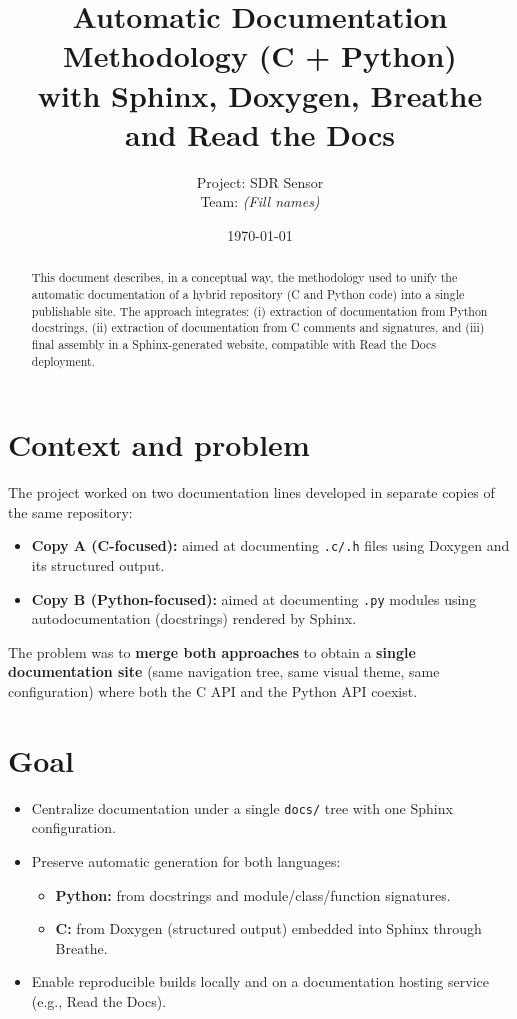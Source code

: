 \documentclass[11pt,a4paper]{article}
\title{\textbf{Automatic Documentation Methodology (C + Python)\\
with Sphinx, Doxygen, Breathe and Read the Docs}}
\author{Project: SDR Sensor \\
Team: \textit{(Fill names)}}
\date{\today}
\begin{document}
\maketitle

\begin{abstract}
This document describes, in a conceptual way, the methodology used to unify the automatic documentation of a hybrid repository (C and Python code) into a single publishable site. The approach integrates: (i) extraction of documentation from Python docstrings, (ii) extraction of documentation from C comments and signatures, and (iii) final assembly in a Sphinx-generated website, compatible with Read the Docs deployment.
\end{abstract}

\section{Context and problem}
The project worked on two documentation lines developed in separate copies of the same repository:

\begin{itemize}[leftmargin=*,itemsep=2pt]
  \item \textbf{Copy A (C-focused):} aimed at documenting \texttt{.c/.h} files using Doxygen and its structured output.
  \item \textbf{Copy B (Python-focused):} aimed at documenting \texttt{.py} modules using autodocumentation (docstrings) rendered by Sphinx.
\end{itemize}

The problem was to \textbf{merge both approaches} to obtain a \textbf{single documentation site} (same navigation tree, same visual theme, same configuration) where both the C API and the Python API coexist.

\section{Goal}
\begin{itemize}[leftmargin=*,itemsep=2pt]
  \item Centralize documentation under a single \texttt{docs/} tree with one Sphinx configuration.
  \item Preserve automatic generation for both languages:
  \begin{itemize}[leftmargin=*,itemsep=2pt]
    \item \textbf{Python:} from docstrings and module/class/function signatures.
    \item \textbf{C:} from Doxygen (structured output) embedded into Sphinx through Breathe.
  \end{itemize}
  \item Enable reproducible builds locally and on a documentation hosting service (e.g., Read the Docs).
\end{itemize}
\end{document}
